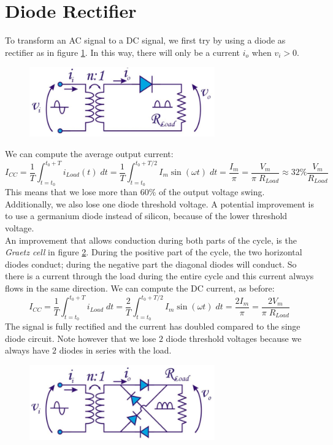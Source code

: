 \section{Diode Rectifier}
\label{sec:diode_rectifier}
To transform an AC signal to a DC signal, we first try by using a diode as rectifier as in figure \ref{fig:rectifier1}. In this way, there will only be a current $i_o$ when $v_i > 0$.
\begin{figure}[h!]
	\centering
	\includegraphics[width=8cm]{figures/ch12/rectifier1.jpg}
	\caption{}
	\label{fig:rectifier1}
\end{figure}
We can compute the average output current:
$$
I_{CC} = \frac{1}{T} \int_{t=t_0}^{t_0 + T} i_{Load}(t) \; dt = \frac{1}{T} \int_{t=t_0}^{t_0 + T/2} I_m \sin(\omega t) \; dt = \frac{I_m}{\pi} = \frac{V_m}{\pi \; R_{Load}} \approx 32\%  \frac{V_m}{R_{Load}} 
$$
This means that we lose more than 60\% of the output voltage swing. Additionally, we also lose one diode threshold voltage. A potential improvement is to use a germanium diode instead of silicon, because of the lower threshold voltage.\\
An improvement that allows conduction during both parts of the cycle, is the \emph{Graetz cell} in figure \ref{fig:graetz}. During the positive part of the cycle, the two horizontal diodes conduct; during the negative part the diagonal diodes will conduct. So there is a current through the load during the entire cycle and this current always flows in the same direction. We can compute the DC current, as before:
$$
I_{CC} = \frac{1}{T} \int_{t=t_0}^{t_0 + T} i_{Load} \; dt = \frac{2}{T} \int_{t=t_0}^{t_0 + T/2} I_m \sin(\omega t) \; dt = \frac{2 I_m}{\pi} = \frac{2 V_m}{\pi \; R_{Load}}
$$
The signal is fully rectified and the current has doubled compared to the singe diode circuit. Note however that we lose $2$ diode threshold voltages because we always have $2$ diodes in series with the load.

\begin{figure}[h!]
	\centering
	\includegraphics[width=8cm]{figures/ch12/graetz.jpg}
	\caption{}
	\label{fig:graetz}
\end{figure}

